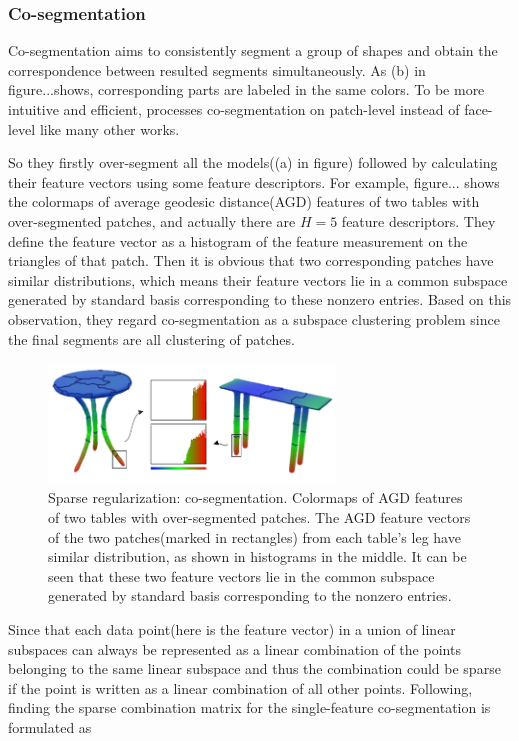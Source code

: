 \subsubsection{Co-segmentation}
Co-segmentation aims to consistently segment a group of shapes and obtain the correspondence between resulted segments simultaneously. As (b) in figure...shows, corresponding parts are labeled in the same colors.
To be more intuitive and efficient, \cite{hu2012co} processes co-segmentation on patch-level instead of face-level like many other works.

So they firstly over-segment all the models((a) in figure) followed by calculating their feature vectors using some feature descriptors.
For example, figure... shows the colormaps of average geodesic distance(AGD) features of two tables with over-segmented patches, and actually there are $H=5$ feature descriptors.
They define the feature vector as a histogram of the feature measurement on the triangles of that patch.
Then it is obvious that two corresponding patches have similar distributions, which means their feature vectors lie in a common subspace generated by standard basis corresponding to these nonzero entries.
Based on this observation, they regard co-segmentation as a subspace clustering problem since the final segments are all clustering of patches.

\begin{figure}[ht]
  \centering
  \includegraphics[width=3in]{images/co-segmentationAGD}
  \caption{Sparse regularization: co-segmentation\cite{hu2012co}. Colormaps of AGD features of two tables with over-segmented patches. The AGD feature vectors of the two patches(marked in rectangles) from each table's leg have similar distribution, as shown in histograms in the middle. It can be seen that these two feature vectors lie in the common subspace generated by standard basis corresponding to the nonzero entries.}
\end{figure}


Since that each data point(here is the feature vector) in a union of linear subspaces can always be represented as a linear combination of the points belonging to the same linear subspace and thus the combination could be sparse if the point is written as a linear combination of all other points. Following\cite{elhamifar2009sparse,wang2011efficient}, finding the sparse combination matrix for the single-feature co-segmentation is formulated as

